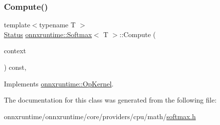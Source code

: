 \subsubsection{\texorpdfstring{Compute()}{Compute()}\hspace{0.1cm}{\footnotesize\ttfamily [2/2]}}
{\footnotesize\ttfamily template$<$typename T $>$ \\
\mbox{\hyperlink{classonnxruntime_1_1common_1_1Status}{Status}} \mbox{\hyperlink{classonnxruntime_1_1Softmax}{onnxruntime\+::\+Softmax}}$<$ T $>$\+::Compute (\begin{DoxyParamCaption}\item[{\mbox{\hyperlink{classonnxruntime_1_1OpKernelContext}{Op\+Kernel\+Context}} $\ast$}]{context }\end{DoxyParamCaption}) const\hspace{0.3cm}{\ttfamily [override]}, {\ttfamily [virtual]}}



Implements \mbox{\hyperlink{classonnxruntime_1_1OpKernel_a9eca8656a78b1b3ab9d3351a12798650}{onnxruntime\+::\+Op\+Kernel}}.



The documentation for this class was generated from the following file\+:\begin{DoxyCompactItemize}
\item 
onnxruntime/onnxruntime/core/providers/cpu/math/\mbox{\hyperlink{cpu_2math_2softmax_8h}{softmax.\+h}}\end{DoxyCompactItemize}
